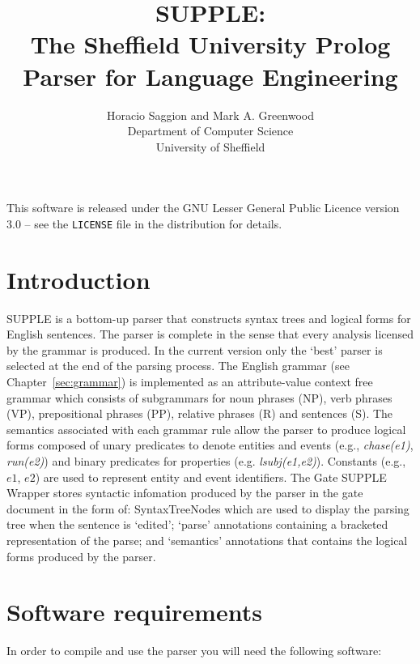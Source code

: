 \documentclass[a4paper,titlepage,openany,twoside]{book}
\title{SUPPLE:\\The Sheffield University Prolog Parser for Language Engineering}
\author{Horacio Saggion and Mark A. Greenwood\\
Department of Computer Science\\University of Sheffield}
\begin{document}
\maketitle


This software is released under the GNU Lesser General Public Licence version
3.0 -- see the {\tt LICENSE} file in the distribution for details.

\chapter{Introduction}


SUPPLE is a bottom-up  parser that constructs syntax trees and
logical forms for English sentences. The parser is complete in the
sense that every analysis licensed by the grammar is produced. In the
current version only the `best' parser is selected at the end of the
parsing process. The English grammar (see Chapter~\ref{sec:grammar}) is implemented as an
attribute-value 
context free grammar which consists of subgrammars for  noun phrases (NP), verb phrases (VP), prepositional 
phrases (PP), relative phrases (R) and sentences (S). The semantics
 associated with each grammar rule allow the parser to produce logical
forms composed of unary predicates to denote  entities and
events (e.g., {\em chase(e1)},  {\em run(e2)}) and binary predicates
for properties  (e.g. {\em lsubj(e1,e2)}). Constants (e.g., $e1$,
$e2$) are used to represent entity and event identifiers.
The Gate SUPPLE Wrapper stores syntactic infomation produced by the
parser
in the gate document in the form of: SyntaxTreeNodes which are used to
display the parsing tree when the sentence is `edited'; `parse'
annotations containing a bracketed representation of the parse; and
`semantics' annotations that contains the logical forms produced by
the parser.  




\chapter{Software requirements}


In order to compile and use the parser you will need the following 
software:
\end{document}
